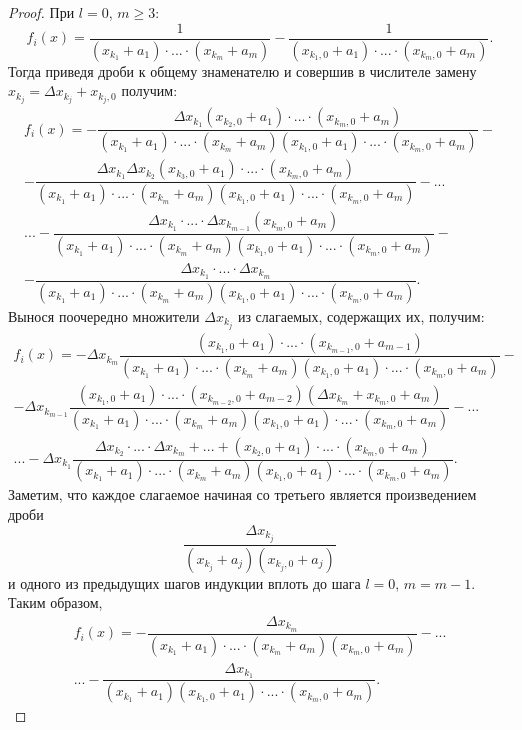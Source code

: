 \documentclass[14pt,a4paper]{extarticle}
\begin{document}
\begin{proof}
		При $l=0$, $m\ge3$:
		\[f_i(x)=\dfrac{1}{(x_{k_1}+a_1)\cdot...\cdot(x_{k_m}+a_m)}-\dfrac{1}{(x_{k_1,0}+a_1)\cdot...\cdot(x_{k_m,0}+a_m)}.\]
		Тогда приведя дроби к общему знаменателю и совершив в числителе замену $x_{k_j}=\Delta x_{k_j} + x_{k_j,0}$ получим:
		\begin{multline*}
			f_i(x)=-\dfrac{\Delta x_{k_1}(x_{k_2,0}+a_1)\cdot...\cdot(x_{k_m,0}+a_m)}{(x_{k_1}+a_1)\cdot...\cdot(x_{k_m}+a_m)(x_{k_1,0}+a_1)\cdot...\cdot(x_{k_m,0}+a_m)}-\\
			-\dfrac{\Delta x_{k_1}\Delta x_{k_2}(x_{k_3,0}+a_1)\cdot...\cdot(x_{k_m,0}+a_m)}{(x_{k_1}+a_1)\cdot...\cdot(x_{k_m}+a_m)(x_{k_1,0}+a_1)\cdot...\cdot(x_{k_m,0}+a_m)}-...\\
			...-\dfrac{\Delta x_{k_1}\cdot...\cdot\Delta x_{k_{m-1}}(x_{k_m,0}+a_m)}{(x_{k_1}+a_1)\cdot...\cdot(x_{k_m}+a_m)(x_{k_1,0}+a_1)\cdot...\cdot(x_{k_m,0}+a_m)}-\\
			-\dfrac{\Delta x_{k_1}\cdot...\cdot\Delta x_{k_{m}}}{(x_{k_1}+a_1)\cdot...\cdot(x_{k_m}+a_m)(x_{k_1,0}+a_1)\cdot...\cdot(x_{k_m,0}+a_m)}.
		\end{multline*}
		Вынося поочередно множители $\Delta x_{k_j}$ из слагаемых, содержащих их, получим:
		\begin{multline*}
			f_i(x)=-\Delta x_{k_m}\dfrac{(x_{k_1,0}+a_1)\cdot...\cdot(x_{k_{m-1},0}+a_{m-1})}{(x_{k_1}+a_1)\cdot...\cdot(x_{k_m}+a_m)(x_{k_1,0}+a_1)\cdot...\cdot(x_{k_m,0}+a_m)}-\\
			-\Delta x_{k_{m-1}}\dfrac{(x_{k_1,0}+a_1)\cdot...\cdot(x_{k_{m-2},0}+a_{m-2})(\Delta x_{k_m}+x_{k_m,0}+a_m)}{(x_{k_1}+a_1)\cdot...\cdot(x_{k_m}+a_m)(x_{k_1,0}+a_1)\cdot...\cdot(x_{k_m,0}+a_m)}-...\\
			...-\Delta x_{k_1}\dfrac{\Delta x_{k_2}\cdot...\cdot\Delta x_{k_m}+...+(x_{k_2,0}+a_1)\cdot...\cdot(x_{k_m,0}+a_m)}{(x_{k_1}+a_1)\cdot...\cdot(x_{k_m}+a_m)(x_{k_1,0}+a_1)\cdot...\cdot(x_{k_m,0}+a_m)}.
		\end{multline*}
		Заметим, что каждое слагаемое начиная со третьего является произведением дроби 
		\[\dfrac{\Delta x_{k_j}}{(x_{k_j}+a_j)(x_{k_j,0}+a_j)}\] 
		и одного из предыдущих шагов индукции вплоть до шага $l=0,\, m=m-1$. Таким образом, 
		\begin{multline*}
			f_i(x)=-\dfrac{\Delta x_{k_m}}{(x_{k_1}+a_1)\cdot...\cdot(x_{k_m}+a_m)(x_{k_m,0}+a_m)}-...\\
			...-\dfrac{\Delta x_{k_1}}{(x_{k_1}+a_1)(x_{k_1,0}+a_1)\cdot...\cdot(x_{k_m,0}+a_m)}.
		\end{multline*}
		

\end{proof}
\end{document}
